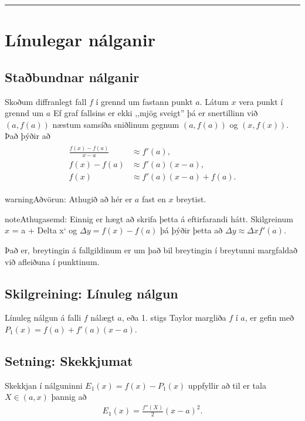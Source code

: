 \documentclass[b5paper,10pt,icelandic]{sphinxmanual}
\begin{document}
\bigskip\hrule\bigskip



\section{Línulegar nálganir}
\label{\detokenize{kafli03:linulegar-nalganir}}

\subsection{Staðbundnar nálganir}
\label{\detokenize{kafli03:stabundnar-nalganir}}
Skoðum diffranlegt fall \(f\) í grennd um fastann punkt
\(a\). Látum \(x\) vera punkt í grennd um \(a\)
Ef graf fallsins er ekki ,,mjög
sveigt” þá er snertillinn við \((a,f(a))\) næstum samsíða
sniðlinum gegnum \((a,f(a))\) og \((x,f(x))\).
Það þýðir að
\begin{equation*}
\begin{split}\begin{aligned}
     \frac{f(x)-f(a)}{x-a} &\approx f'(a),\\
     f(x)-f(a) &\approx  f'(a)(x-a),\\
     f(x) &\approx f'(a)(x-a) + f(a).
\end{aligned}\end{split}
\end{equation*}
\begin{sphinxadmonition}{warning}{Aðvörun:}
Athugið að hér er \(a\) fast en \(x\) breytist.
\end{sphinxadmonition}

\begin{sphinxadmonition}{note}{Athugasemd:}
Einnig er hægt að skrifa þetta á eftirfarandi hátt.
Skilgreinum \(x\) = a + Delta x{}` og
\(\Delta y = f(x) - f(a)\) þá þýðir þetta að
\(\Delta y \approx \Delta x f'(a)\).

Það er, breytingin á fallgildinum er um það bil breytingin í
breytunni margfaldað við afleiðuna í punktinum.
\end{sphinxadmonition}


\subsection{Skilgreining: Línuleg nálgun}
\label{\detokenize{kafli03:skilgreining-linuleg-nalgun}}
Línuleg nálgun á falli \(f\) nálægt \(a\), eða 1. stigs Taylor
margliða \(f\) í \(a\), er gefin með
\(P_1(x)=f(a)+f'(a)(x-a)\).


\subsection{Setning: Skekkjumat}
\label{\detokenize{kafli03:setning-skekkjumat}}
Skekkjan í nálguninni \(E_1(x)=f(x)-P_1(x)\) uppfyllir að til er
tala \(X \in (a,x)\) þannig að
\begin{equation*}
\begin{split}E_1(x)=\frac{f''(X)}{2}(x-a)^2.\end{split}
\end{equation*}
\end{document}
